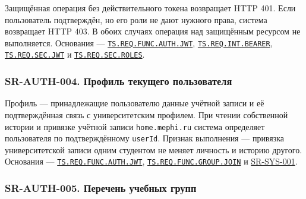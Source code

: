 \documentclass[12pt,a4paper]{article}
\begin{document}
Защищённая операция без действительного токена возвращает HTTP 401. Если пользователь подтверждён, но его роли не дают нужного права, система возвращает HTTP 403. В обоих случаях операция над защищённым ресурсом не выполняется. Основания --- {\href{../02\_Техническое\_задание/Техническое\_задание.pdf\#ts-req-func-auth-jwt}{\texttt{TS.\allowbreak{}REQ.\allowbreak{}FUNC.\allowbreak{}AUTH.\allowbreak{}JWT}}}, {\href{../02\_Техническое\_задание/Техническое\_задание.pdf\#ts-req-int-bearer}{\texttt{TS.\allowbreak{}REQ.\allowbreak{}INT.\allowbreak{}BEARER}}}, {\href{../02\_Техническое\_задание/Техническое\_задание.pdf\#ts-req-sec-jwt}{\texttt{TS.\allowbreak{}REQ.\allowbreak{}SEC.\allowbreak{}JWT}}} и {\href{../02\_Техническое\_задание/Техническое\_задание.pdf\#ts-req-sec-roles}{\texttt{TS.\allowbreak{}REQ.\allowbreak{}SEC.\allowbreak{}ROLES}}}.

\subsubsection{SR-AUTH-004. Профиль текущего пользователя}\label{sr-auth-004-ux43fux440ux43eux444ux438ux43bux44c-ux442ux435ux43aux443ux449ux435ux433ux43e-ux43fux43eux43bux44cux437ux43eux432ux430ux442ux435ux43bux44f}

\hypertarget{sr-auth-004-профиль-текущего-пользователя}{}

\hypertarget{sr-auth-004}{}

Профиль --- принадлежащие пользователю данные учётной записи и её подтверждённая связь с университетским профилем. При чтении собственной истории и привязке учётной записи \texttt{home.\allowbreak{}mephi.\allowbreak{}ru} система определяет пользователя по подтверждённому \texttt{userId}. Признак выполнения --- привязка университетской записи одним студентом не меняет личность и историю другого. Основания --- {\href{../02\_Техническое\_задание/Техническое\_задание.pdf\#ts-req-func-auth-jwt}{\texttt{TS.\allowbreak{}REQ.\allowbreak{}FUNC.\allowbreak{}AUTH.\allowbreak{}JWT}}}, {\href{../02\_Техническое\_задание/Техническое\_задание.pdf\#ts-req-func-group-join}{\texttt{TS.\allowbreak{}REQ.\allowbreak{}FUNC.\allowbreak{}GROUP.\allowbreak{}JOIN}}} и {\hyperlink{sr-sys-001}{SR-SYS-001}}.

\subsubsection{SR-AUTH-005. Перечень учебных групп}\label{sr-auth-005-ux43fux435ux440ux435ux447ux435ux43dux44c-ux443ux447ux435ux431ux43dux44bux445-ux433ux440ux443ux43fux43f}
\end{document}
